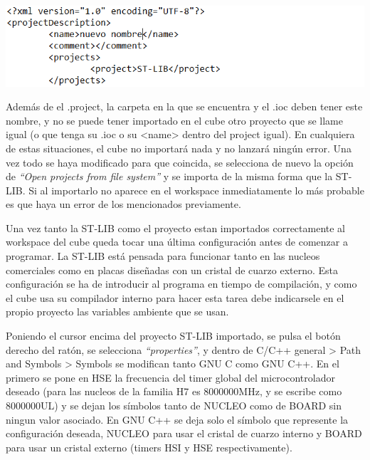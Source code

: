 \documentclass{report}
\begin{document}
\includegraphics{Imagenes/cambios project.PNG}

\par \vspace{0.3 cm}
Además de el .project, la carpeta en la que se encuentra y el .ioc deben tener este nombre, y no se puede tener importado en el cube otro proyecto que se llame igual (o que tenga su .ioc o su <name> dentro del project igual). En cualquiera de estas situaciones, el cube no importará nada y no lanzará ningún error. Una vez todo se haya modificado para que coincida, se selecciona de nuevo la opción de \textit{``Open projects from file system''} y se importa de la misma forma que la ST-LIB. Si al importarlo no aparece en el workspace inmediatamente lo más probable es que haya un error de los mencionados previamente.  
\par \vspace{0.3cm}
Una vez tanto la ST-LIB como el proyecto estan importados correctamente al workspace del cube queda tocar una última configuración antes de comenzar a programar. La ST-LIB está pensada para funcionar tanto en las nucleos comerciales como en placas diseñadas con un cristal de cuarzo externo. Esta configuración se ha de introducir al programa en tiempo de compilación, y como el cube usa su compilador interno para hacer esta tarea debe indicarsele en el propio proyecto las variables ambiente que se usan. 
\par \vspace{0.3cm}
Poniendo el cursor encima del proyecto ST-LIB importado, se pulsa el botón derecho del ratón, se selecciona \textit{``properties''}, y dentro de C/C++ general > Path and Symbols > Symbols se modifican tanto GNU C como GNU C++. En el primero se pone en HSE la frecuencia del timer global del microcontrolador deseado (para las nucleos de la familia H7 es 8000000MHz, y se escribe como 8000000UL) y se dejan los símbolos tanto de NUCLEO como de BOARD sin ningun valor asociado. En GNU C++ se deja solo el símbolo que represente la configuración deseada, NUCLEO para usar el cristal de cuarzo interno y BOARD para usar un cristal externo (timers HSI y HSE respectivamente). \par
\end{document}
